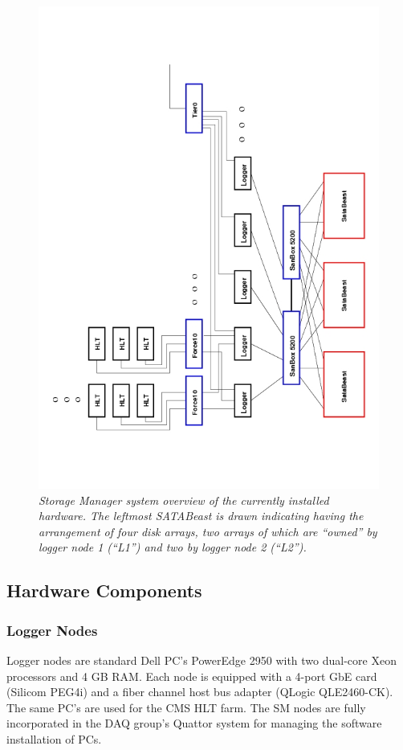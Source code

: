 \begin{figure}[tbh]
\begin{center}  
\includegraphics[width=1.0\textwidth]{Hardware/SMsystem}
\caption{\emph{ Storage Manager system overview of the currently installed hardware. 
The leftmost SATABeast is drawn indicating having the arrangement of four disk arrays, 
two arrays of which are ``owned'' by logger node 1 (``L1'') and two by logger node 2 (``L2'').}}
\label{fig:system}
\end{center}
\end{figure}  


\subsection{Hardware Components}

\subsubsection{Logger Nodes}
Logger nodes are standard Dell PC's PowerEdge 2950 with two dual-core Xeon processors and 4 GB RAM. 
Each node is equipped with a 4-port GbE card (Silicom PEG4i) and 
a fiber channel host bus adapter (QLogic QLE2460-CK). 
The same PC's are used for the CMS HLT farm.
The SM nodes are fully incorporated in the DAQ group's Quattor system for managing 
the software installation of PCs.

